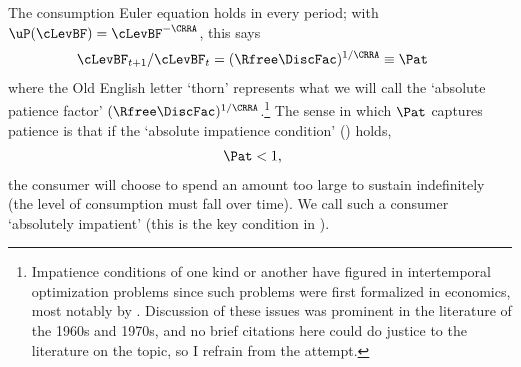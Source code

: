 \documentclass[./BufferStockTheory.tex]{subfiles}
\begin{document}
\hypertarget{AIC}{}
The consumption Euler equation holds in every period; with $\uP(\cLevBF)=\cLevBF^{-\CRRA}$, this says\hypertarget{Pat}{}
\begin{equation}\begin{gathered}\begin{aligned}
 \cLevBF_{t+1}/\cLevBF_{t}  & = (\Rfree\DiscFac)^{1/\CRRA} \equiv \Pat   \label{eq:Pat}
\end{aligned}\end{gathered}\end{equation}
where the Old English letter `thorn' represents what we will call the
`absolute patience factor' $(\Rfree
\DiscFac)^{1/\CRRA}$.\footnote{Impatience conditions of one kind or
  another have figured in intertemporal optimization problems since
  such problems were first formalized in economics, most notably by \cite{ramseySave}.
  Discussion of these issues was prominent in the literature of the
  1960s and 1970s, and no brief citations here could do justice to the literature on the topic, so I refrain from the attempt.}  The sense in which $\Pat$ captures
patience is that if the `absolute impatience condition' (\AIC) holds,
\begin{equation}\begin{gathered}\begin{aligned}
  \label{eq:AIC}
  \Pat  & < 1,
\end{aligned}\end{gathered}\end{equation}
the consumer will choose to spend an amount too large to sustain indefinitely (the
level of consumption must fall over time).  We call such a consumer `absolutely impatient' (this is the key condition in \cite{bewleyPIH}).
\end{document}
